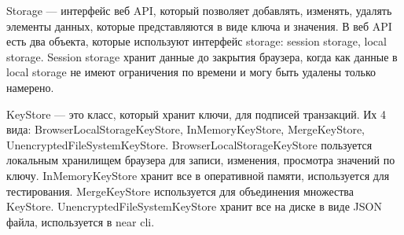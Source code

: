 \begin{figure}
	\centering
    \caption{}
\end{figure}

\begin{definition}
    Storage --- интерфейс веб API, который позволяет добавлять, изменять, удалять элементы данных, которые представляются в виде ключа и значения\cite{webapistorage}. В веб API есть два объекта, которые используют интерфейс storage: session storage, local storage\cite{webapilocalstorage}. Session storage хранит данные до закрытия браузера, когда как данные в local storage не имеют ограничения по времени и могу быть удалены только намерено.
\end{definition}

\begin{definition}
    KeyStore\cite{nearclasskeystore} --- это класс, который хранит ключи, для подписей транзакций. Их 4 вида: BrowserLocalStorageKeyStore, InMemoryKeyStore, MergeKeyStore, UnencryptedFileSystemKeyStore. BrowserLocalStorageKeyStore пользуется локальным хранилищем браузера для записи, изменения, просмотра значений по ключу. InMemoryKeyStore хранит все в оперативной памяти, используется для тестирования. MergeKeyStore используется для объединения множества KeyStore. UnencryptedFileSystemKeyStore хранит все на диске в виде JSON файла, используется в near cli\cite{nearcli}.
\end{definition}

